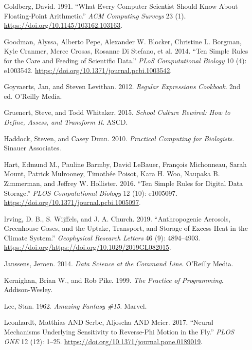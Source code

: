\documentclass[
]{krantz}
\newlength{\cslhangindent}
\newenvironment{cslreferences}%
  {\setlength{\parindent}{0pt}%
  \everypar{\setlength{\hangindent}{\cslhangindent}}\ignorespaces}%
  {\par}
\begin{document}
\begin{cslreferences}
\leavevmode\hypertarget{ref-Gold1991}{}%
Goldberg, David. 1991. ``What Every Computer Scientist Should Know About Floating-Point Arithmetic.'' \emph{ACM Computing Surveys} 23 (1). \url{https://doi.org/10.1145/103162.103163}.

\leavevmode\hypertarget{ref-Good2014}{}%
Goodman, Alyssa, Alberto Pepe, Alexander W. Blocker, Christine L. Borgman, Kyle Cranmer, Merce Crosas, Rosanne Di Stefano, et al. 2014. ``Ten Simple Rules for the Care and Feeding of Scientific Data.'' \emph{PLoS Computational Biology} 10 (4): e1003542. \url{https://doi.org/10.1371/journal.pcbi.1003542}.

\leavevmode\hypertarget{ref-Goyv2012}{}%
Goyvaerts, Jan, and Steven Levithan. 2012. \emph{Regular Expressions Cookbook}. 2nd ed. O'Reilly Media.

\leavevmode\hypertarget{ref-Grue2015}{}%
Gruenert, Steve, and Todd Whitaker. 2015. \emph{School Culture Rewired: How to Define, Assess, and Transform It}. ASCD.

\leavevmode\hypertarget{ref-Hadd2010}{}%
Haddock, Steven, and Casey Dunn. 2010. \emph{Practical Computing for Biologists}. Sinauer Associates.

\leavevmode\hypertarget{ref-Hart2016}{}%
Hart, Edmund M., Pauline Barmby, David LeBauer, François Michonneau, Sarah Mount, Patrick Mulrooney, Timothée Poisot, Kara H. Woo, Naupaka B. Zimmerman, and Jeffrey W. Hollister. 2016. ``Ten Simple Rules for Digital Data Storage.'' \emph{PLOS Computational Biology} 12 (10): e1005097. \url{https://doi.org/10.1371/journal.pcbi.1005097}.

\leavevmode\hypertarget{ref-Irving2019}{}%
Irving, D. B., S. Wijffels, and J. A. Church. 2019. ``Anthropogenic Aerosols, Greenhouse Gases, and the Uptake, Transport, and Storage of Excess Heat in the Climate System.'' \emph{Geophysical Research Letters} 46 (9): 4894--4903. \url{https://doi.org/https://doi.org/10.1029/2019GL082015}.

\leavevmode\hypertarget{ref-Jans2014}{}%
Janssens, Jeroen. 2014. \emph{Data Science at the Command Line}. O'Reilly Media.

\leavevmode\hypertarget{ref-Kern1999}{}%
Kernighan, Brian W., and Rob Pike. 1999. \emph{The Practice of Programming}. Addison-Wesley.

\leavevmode\hypertarget{ref-Lee1962}{}%
Lee, Stan. 1962. \emph{Amazing Fantasy \#15}. Marvel.

\leavevmode\hypertarget{ref-Leon2017}{}%
Leonhardt, Matthias AND Serbe, Aljoscha AND Meier. 2017. ``Neural Mechanisms Underlying Sensitivity to Reverse-Phi Motion in the Fly.'' \emph{PLOS ONE} 12 (12): 1--25. \url{https://doi.org/10.1371/journal.pone.0189019}.


\end{cslreferences}
\end{document}
